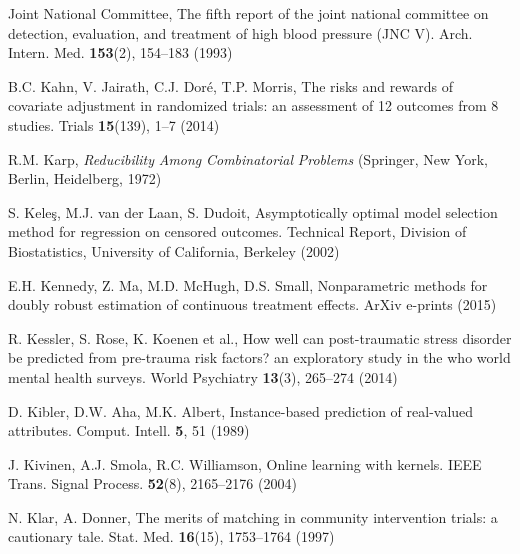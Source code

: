 \begin{list}{}{\setlength{\leftmargin}{2.1em}\setlength{\labelwidth}{0pt}
  \setlength{\labelsep}{0pt}\setlength{\itemindent}{-2.1em}
  \setlength{\parsep}{0pt}\setlength{\itemsep}{2pt}\setlength{\topsep}{0pt}}
\item\label{refentry:REF177}Joint National Committee, The fifth report of the joint national committee on detection, evaluation, and treatment of high blood pressure (JNC V). Arch. Intern. Med. \textbf{153}(2), 154--183 (1993)\label{refend:REF177}
\item\label{refentry:REF178}B.C. Kahn, V. Jairath, C.J. Doré, T.P. Morris, The risks and rewards of covariate adjustment in randomized trials: an assessment of 12 outcomes from 8 studies. Trials \textbf{15}(139), 1--7 (2014)\label{refend:REF178}
\item\label{refentry:REF179}R.M. Karp, \textit{Reducibility} \textit{Among} \textit{Combinatorial} \textit{Problems} (Springer, New York, Berlin, Heidelberg, 1972)\label{refend:REF179}
\item\label{refentry:REF180}S. Keleş, M.J. van der Laan, S. Dudoit, Asymptotically optimal model selection method for regression on censored outcomes. Technical Report, Division of Biostatistics, University of California, Berkeley (2002)\label{refend:REF180}
\item\label{refentry:REF181}E.H. Kennedy, Z. Ma, M.D. McHugh, D.S. Small, Nonparametric methods for doubly robust estimation of continuous treatment effects. ArXiv e-prints (2015)\label{refend:REF181}
\item\label{refentry:REF182}R. Kessler, S. Rose, K. Koenen et al., How well can post-traumatic stress disorder be predicted from pre-trauma risk factors? an exploratory study in the who world mental health surveys. World Psychiatry \textbf{13}(3), 265--274 (2014)\label{refend:REF182}
\item\label{refentry:REF183}D. Kibler, D.W. Aha, M.K. Albert, Instance-based prediction of real-valued attributes. Comput. Intell. \textbf{5}, 51 (1989)\label{refend:REF183}
\item\label{refentry:REF184}J. Kivinen, A.J. Smola, R.C. Williamson, Online learning with kernels. IEEE Trans. Signal Process. \textbf{52}(8), 2165--2176 (2004)\label{refend:REF184}
\item\label{refentry:REF185}N. Klar, A. Donner, The merits of matching in community intervention trials: a cautionary tale. Stat. Med. \textbf{16}(15), 1753--1764 (1997)\label{refend:REF185}

\end{list}
